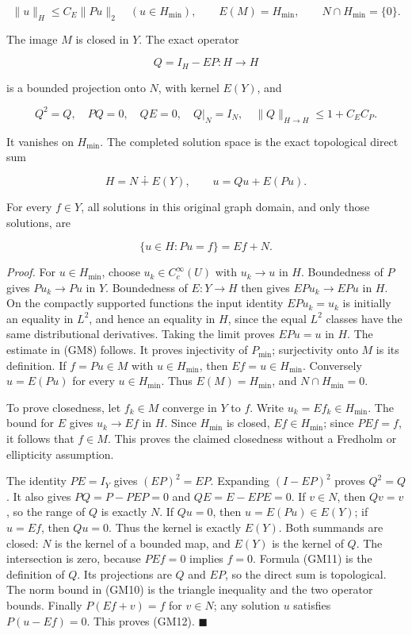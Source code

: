 \documentclass[
  11pt,
]{article}
\begin{document}
\[
 \|u\|_H\leq C_E\|Pu\|_2\quad(u\in H_{\min}),
 \qquad E(M)=H_{\min},
 \qquad N\cap H_{\min}=\{0\}.
 \tag{GM8}
\]

The image \(M\) is closed in
\(Y\). The exact operator

\[
 Q=I_H-EP:H\to H
 \tag{GM9}
\]

is a bounded projection onto \(N\), with kernel
\(E(Y)\), and

\[
 Q^2=Q,\quad PQ=0,\quad QE=0,\quad Q|_N=I_N,\quad
 \|Q\|_{H\to H}\leq 1+C_EC_P.
 \tag{GM10}
\]

It vanishes on \(H_{\min}\). The completed solution space
is the exact topological direct sum

\[
 H=N\mathbin{\dotplus}E(Y),\qquad
 u=Qu+E(Pu).
 \tag{GM11}
\]

For every \(f\in Y\), all solutions in this original
graph domain, and only those solutions, are

\[
 \{u\in H:Pu=f\}=Ef+N.
 \tag{GM12}
\]

\emph{Proof.} For \(u\in H_{\min}\), choose
\(u_k\in C_c^\infty(U)\) with \(u_k\to u\) in
\(H\). Boundedness of \(P\)
gives \(Pu_k\to Pu\) in \(Y\).
Boundedness of \(E:Y\to H\) then gives
\(EPu_k\to EPu\) in \(H\). On the
compactly supported functions the input identity
\(EPu_k=u_k\) is initially an equality in
\(L^2\), and hence an equality in
\(H\), since the equal \(L^2\)
classes have the same distributional derivatives. Taking the limit
proves \(EPu=u\) in \(H\). The
estimate in (GM8) follows. It proves injectivity of
\(P_{\min}\); surjectivity onto \(M\)
is its definition. If \(f=Pu\in M\) with
\(u\in H_{\min}\), then \(Ef=u\in H_{\min}\). Conversely
\(u=E(Pu)\) for every \(u\in H_{\min}\). Thus
\(E(M)=H_{\min}\), and \(N\cap H_{\min}=0\).

To prove closedness, let \(f_k\in M\) converge in
\(Y\) to \(f\). Write
\(u_k=Ef_k\in H_{\min}\). The bound for \(E\)
gives \(u_k\to Ef\) in \(H\). Since
\(H_{\min}\) is closed, \(Ef\in H_{\min}\); since
\(PEf=f\), it follows that \(f\in M\).
This proves the claimed closedness without a Fredholm or ellipticity
assumption.

The identity \(PE=I_Y\) gives
\((EP)^2=EP\). Expanding \((I-EP)^2\) proves
\(Q^2=Q\). It also gives \(PQ=P-PEP=0\) and
\(QE=E-EPE=0\). If \(v\in N\), then
\(Qv=v\), so the range of \(Q\)
is exactly \(N\). If \(Qu=0\),
then \(u=E(Pu)\in E(Y)\); if \(u=Ef\), then
\(Qu=0\). Thus the kernel is exactly
\(E(Y)\). Both summands are closed:
\(N\) is the kernel of a bounded map, and
\(E(Y)\) is the kernel of \(Q\).
The intersection is zero, because \(PEf=0\) implies
\(f=0\). Formula (GM11) is the definition of
\(Q\). Its projections are
\(Q\) and \(EP\), so the direct
sum is topological. The norm bound in (GM10) is the triangle inequality
and the two operator bounds. Finally \(P(Ef+v)=f\) for
\(v\in N\); any solution \(u\)
satisfies \(P(u-Ef)=0\). This proves (GM12).
\hfill\ensuremath{\blacksquare}
\end{document}
